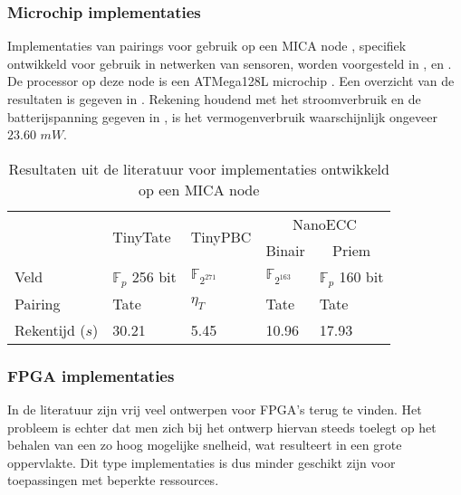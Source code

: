 \subsubsection{Microchip implementaties}

Implementaties van pairings voor gebruik op een MICA node \cite{mica}, specifiek ontwikkeld voor gebruik in netwerken van sensoren, worden voorgesteld in \cite{tinytate}, \cite{tinypbc} en \cite{nanoecc}. De processor op deze node is een ATMega128L microchip \cite{atmega}. Een overzicht van de resultaten is gegeven in . Rekening houdend met het stroomverbruik en de batterijspanning gegeven in \cite{nanoecc}, is het vermogenverbruik waarschijnlijk ongeveer $23.60$ $mW$.

\begin{table}[h]
	\caption[Resultaten uit de literatuur voor implementaties ontwikkeld op een MICA node]{Resultaten uit de literatuur voor implementaties ontwikkeld op een MICA node \cite{mica}}
	\label{tabel-resultaten-sensor}

	\centering
	\begin{tabular}{lllll}
		\toprule
		& \multirow{2}{*}{TinyTate \cite{tinytate}}	& \multirow{2}{*}{TinyPBC \cite{tinypbc}} &	\multicolumn{2}{c}{NanoECC \cite{nanoecc}}\\
		\cmidrule{4-5}
		& & & \multicolumn{1}{c}{Binair} & \multicolumn{1}{c}{Priem}\\
			\midrule
		Veld					& $\mathbb{F}_{p}$ 256 bit	& $\mathbb{F}_{2^{271}}$	& $\mathbb{F}_{2^{163}}$	& $\mathbb{F}_{p}$ 160 bit\\
		Pairing				& Tate							& $\eta_T$ 						& Tate							& Tate\\
		Rekentijd ($s$)	& 30.21							& 5.45							& 10.96							& 17.93\\
		\bottomrule
	\end{tabular}
\end{table}

\subsubsection{FPGA implementaties}

In de literatuur zijn vrij veel ontwerpen voor FPGA's terug te vinden. Het probleem is echter dat men zich bij het ontwerp hiervan steeds toelegt op het behalen van een zo hoog mogelijke snelheid, wat resulteert in een grote oppervlakte. Dit type implementaties is dus minder geschikt zijn voor toepassingen met beperkte ressources.


